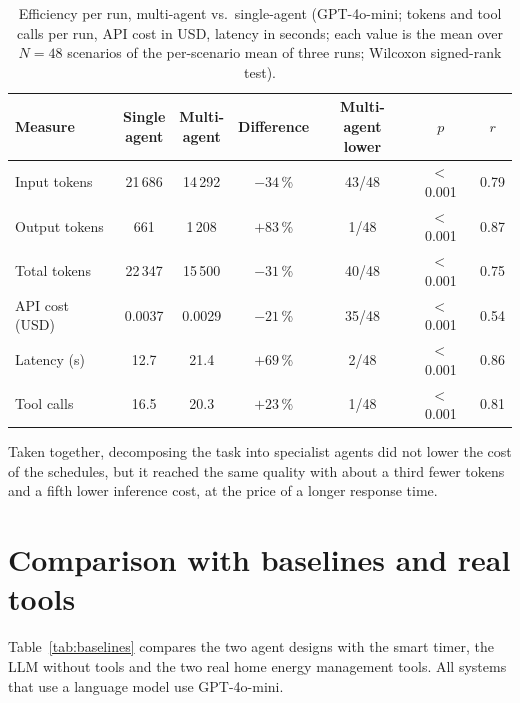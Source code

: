 \begin{table}[h!]
\caption{Efficiency per run, multi-agent vs.\ single-agent (GPT-4o-mini; tokens and tool calls per run, API cost in USD, latency in seconds; each value is the mean over $N = 48$ scenarios of the per-scenario mean of three runs; Wilcoxon signed-rank test).}
\label{tab:efficiency-tests}
\small
\begin{tabular*}{\textwidth}{@{\extracolsep{\fill}}lcccccc}
\toprule
Measure & \makecell{Single\\agent} & \makecell{Multi-\\agent} & Difference & \makecell{Multi-agent\\lower} & $p$ & $r$ \\
\midrule
Input tokens & 21\,686 & 14\,292 & $-34$\,\% & 43/48 & $<$\,0.001 & 0.79 \\
Output tokens & 661 & 1\,208 & $+83$\,\% & 1/48 & $<$\,0.001 & 0.87 \\
Total tokens & 22\,347 & 15\,500 & $-31$\,\% & 40/48 & $<$\,0.001 & 0.75 \\
API cost (USD) & 0.0037 & 0.0029 & $-21$\,\% & 35/48 & $<$\,0.001 & 0.54 \\
Latency (s) & 12.7 & 21.4 & $+69$\,\% & 2/48 & $<$\,0.001 & 0.86 \\
Tool calls & 16.5 & 20.3 & $+23$\,\% & 1/48 & $<$\,0.001 & 0.81 \\
\bottomrule
\end{tabular*}
\end{table}

Taken together, decomposing the task into specialist agents did not
lower the cost of the schedules, but it reached the same quality with
about a third fewer tokens and a fifth lower inference cost, at the price
of a longer response time.

\section{Comparison with baselines and real tools}
\label{sec:baselines}

Table~\ref{tab:baselines} compares the two agent designs with the smart
timer, the LLM without tools and the two real home energy management
tools. All systems that use a language model use GPT-4o-mini.

